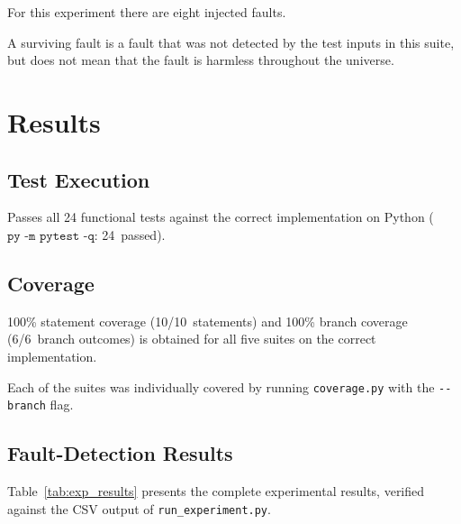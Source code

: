 \documentclass[conference]{IEEEtran}
\begin{document}
For this experiment there are eight injected faults.

A surviving fault is a fault that was not detected by the test inputs in this suite, but does not mean that the fault is harmless throughout the universe.





\section{Results}

\label{sec:results}



\subsection{Test Execution}

Passes all 24 functional tests against the correct implementation on Python ($\texttt{py -m pytest -q}$: 24~passed).



\subsection{Coverage}

100\% statement coverage (10/10~statements) and 100\% branch coverage (6/6~branch outcomes) is obtained for all five suites on the correct implementation.

Each of the suites was individually covered by running \texttt{coverage.py} with the \texttt{-{}-branch} flag.



\subsection{Fault-Detection Results}

Table~\ref{tab:exp_results} presents the complete experimental results, verified against the CSV output of \texttt{run\_experiment.py}.
\end{document}
